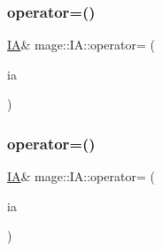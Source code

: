 \subsubsection{\texorpdfstring{operator=()}{operator=()}\hspace{0.1cm}{\footnotesize\ttfamily [1/2]}}
{\footnotesize\ttfamily \hyperlink{structmage_1_1_i_a}{IA}\& mage\+::\+I\+A\+::operator= (\begin{DoxyParamCaption}\item[{const \hyperlink{structmage_1_1_i_a}{IA} \&}]{ia }\end{DoxyParamCaption})\hspace{0.3cm}{\ttfamily [delete]}}

\hypertarget{structmage_1_1_i_a_a871eeb0b10aa559545e3c1b03c61387a}{}\label{structmage_1_1_i_a_a871eeb0b10aa559545e3c1b03c61387a} 
\subsubsection{\texorpdfstring{operator=()}{operator=()}\hspace{0.1cm}{\footnotesize\ttfamily [2/2]}}
{\footnotesize\ttfamily \hyperlink{structmage_1_1_i_a}{IA}\& mage\+::\+I\+A\+::operator= (\begin{DoxyParamCaption}\item[{\hyperlink{structmage_1_1_i_a}{IA} \&\&}]{ia }\end{DoxyParamCaption})\hspace{0.3cm}{\ttfamily [delete]}}

